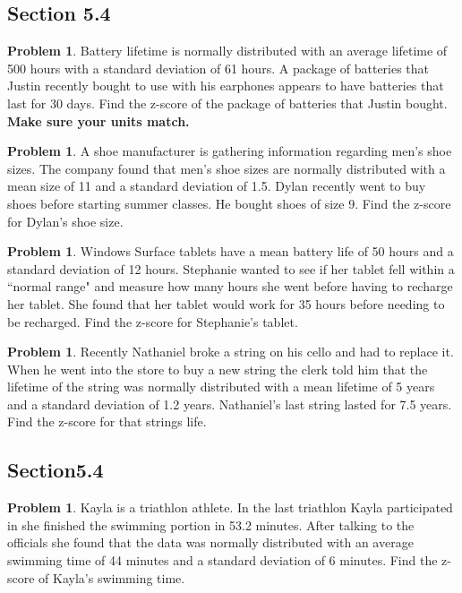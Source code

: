 \documentclass[11pt]{scrartcl}
\theoremstyle{definition}
\newtheorem{problem}[theorem]{Problem}
\begin{document}
\newpage

\subsection*{Section 5.4}
\begin{problem}
	Battery lifetime is normally distributed with an average lifetime of 500 hours with a standard deviation of 61 hours. A package of batteries that Justin recently bought to use with his earphones appears to have batteries that last for 30 days. Find the z-score of the package of batteries that Justin bought. \textbf{Make sure your units match.}
\end{problem}


\begin{problem}
	A shoe manufacturer is gathering information regarding men's shoe sizes. The company found that men's shoe sizes are normally distributed with a mean size of 11 and a standard deviation of 1.5. Dylan recently went to buy shoes before starting summer classes. He bought shoes of size 9. Find the z-score for Dylan's shoe size.
\end{problem}


\begin{problem}
	 Windows Surface tablets have a mean battery life of 50 hours and a standard deviation of 12 hours. Stephanie wanted to see if her tablet fell within a ``normal range" and measure how many hours she went before having to recharge her tablet. She found that her tablet would work for 35 hours before needing to be recharged. Find the z-score for Stephanie's tablet.
\end{problem}


\begin{problem}
	Recently Nathaniel broke a string on his cello and had to replace it. When he went into the store to buy a new string the clerk told him that the lifetime of the string was normally distributed with a mean lifetime of 5 years and a standard deviation of 1.2 years. Nathaniel's last string lasted for 7.5 years. Find the z-score for that strings life.
\end{problem}

\vspace{1cm}
\subsection*{Section5.4}

\begin{problem}
	Kayla is a triathlon athlete. In the last triathlon Kayla participated in she finished the swimming portion in 53.2 minutes. After talking to the officials she found that the data was normally distributed with an average swimming time of 44 minutes and a standard deviation of 6 minutes. Find the z-score of Kayla's swimming time. 
\end{problem}
\end{document}
